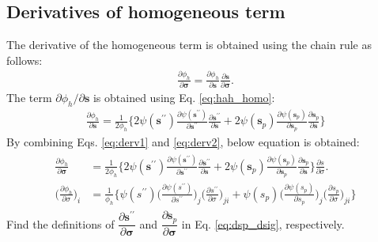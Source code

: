 \documentclass[12pt]{amsart}
\begin{document}
\subsection{Derivatives of homogeneous term}
\label{sec:2.1}
The derivative of the homogeneous term is obtained using the chain rule as follows:
\begin{eqnarray}
  \label{eq:derv1}
  \frac{\partial\phi_h}{\partial\mathbf{\sigma}}  =   \frac{\partial\phi_h}{\partial\mathbf{s}} \frac{\partial\mathbf{s}}{\partial\mathbf{\sigma}}.
\end{eqnarray}
The term $\partial\phi_h/\partial \mathbf{s} $ is obtained using Eq. \ref{eq:hah_homo}:
\begin{eqnarray}
  \label{eq:derv2}
  \frac{\partial{\phi_h}  }{\partial{\mathbf{s}}} = \frac{1}{2\phi_h}\bigg\{ 2\psi(\mathbf{s}^{\prime\prime})\frac{\partial{\psi(\mathbf{s}^{\prime\prime})}}{\partial{\mathbf{s}^{\prime\prime}}}  \frac{\partial\mathbf{s}^{\prime\prime}}{\partial \mathbf{s}}  +  2\psi(\mathbf{s}_p) \frac{\partial{\psi(\mathbf{s}_p)}}{\partial{\mathbf{s}_p}} \frac{\partial{\mathbf{s}_p}}{\partial{\mathbf{s}}}\bigg\}
\end{eqnarray}
By combining Eqs. \ref{eq:derv1} and \ref{eq:derv2}, below equation is obtained:
\begin{eqnarray}
  \label{eq:derv3}
  \begin{split}
  \frac{\partial{\phi_h}}{\partial{\mathbf{\sigma}}} &=\frac{1}{2\phi_h}\bigg\{ 2\psi(\mathbf{s}^{\prime\prime})\frac{\partial{\psi(\mathbf{s}^{\prime\prime})}}{\partial{\mathbf{s}^{\prime\prime}}}  \frac{\partial\mathbf{s}^{\prime\prime}}{\partial \mathbf{s}} + 2\psi(\mathbf{s}_p) \frac{\partial{\psi(\mathbf{s}_p)}}{\partial{\mathbf{s}_p}} \frac{\partial{\mathbf{s}_p}}{\partial{\mathbf{s}}}\bigg\} \frac{\partial{s}}{\partial{\sigma}}.\\
  \Big(\frac{\partial{\phi_h}}{\partial\sigma}\Big)_i &= \frac{1}{\phi_h}\bigg\{ \psi(s^{\prime\prime})\Big(\frac{\partial{\psi(s^{\prime\prime})}}{\partial{s^{\prime\prime}}}\Big)_{j}  \Big(\frac{\partial s^{\prime\prime}}{\partial\sigma}\Big)_{ji}+\psi(s_p) \Big(\frac{\partial{\psi(s_p)}}{\partial{s_p}}\Big)_{j} \Big(\frac{\partial{s_p}}{\partial\sigma}\Big)_{ji}\bigg\}
  \end{split}
\end{eqnarray}
Find the definitions of $\dfrac{\partial\mathbf{s}^{\prime\prime}}{\partial\mathbf{\sigma}}$ and $\dfrac{\partial\mathbf{s}_p}{\partial\mathbf{\sigma}}$ in Eq. \ref{eq:dsp_dsig}, respectively.
\end{document}
